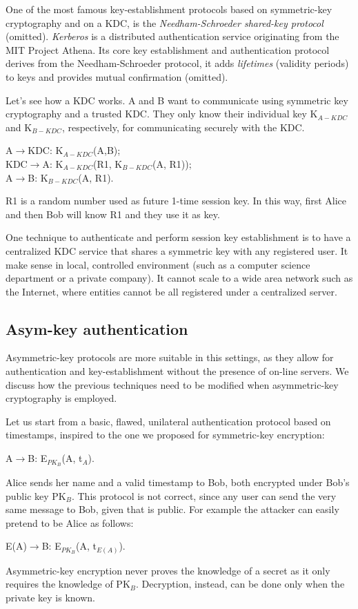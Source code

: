 \documentclass[a4paper, 12pt]{report}
\begin{document}
One of the most famous key-establishment protocols based on symmetric-key cryptography and on a KDC, is the \textit{Needham-Schroeder shared-key protocol} (omitted). \textit{Kerberos} is a distributed authentication service originating from the MIT Project Athena. Its core key establishment and authentication protocol derives from the Needham-Schroeder protocol, it adds \textit{lifetimes} (validity periods) to keys and provides mutual confirmation (omitted).

Let's see how a KDC works. A and B want to communicate using symmetric key cryptography and a trusted KDC. They only know their individual key K$_{A-KDC}$ and K$_{B-KDC}$, respectively, for communicating securely with the KDC.
\begin{center}
	A$\rightarrow$KDC: K$_{A-KDC}$(A,B);\\
	KDC$\rightarrow$A: K$_{A-KDC}$(R1, K$_{B-KDC}$(A, R1));\\
	A$\rightarrow$B: K$_{B-KDC}$(A, R1).
\end{center}

R1 is a random number used as future 1-time session key. In this way, first Alice and then Bob will know R1 and they use it as key.

One technique to authenticate and perform session key establishment is to have a centralized KDC service that shares a symmetric key with any registered user. It make sense in local, controlled environment (such as a computer science department or a private company). It cannot scale to a wide area network such as the Internet, where entities cannot be all registered under a centralized server.

\subsection*{Asym-key authentication}
Asymmetric-key protocols are more suitable in this settings, as they allow for authentication and key-establishment without the presence of on-line servers. We discuss how the previous techniques need to be modified when asymmetric-key cryptography is employed.

Let us start from a basic, flawed, unilateral authentication protocol based on timestamps, inspired to the one we proposed for symmetric-key encryption:
\begin{center}
	A$\rightarrow$B: E$_{PK_B}$(A, t$_A$).
\end{center}

Alice sends her name and a valid timestamp to Bob, both encrypted under Bob's public key PK$_B$. This protocol is not correct, since any user can send the very same message to Bob, given that is public. For example the attacker can easily pretend to be Alice as follows:
\begin{center}
	E(A)$\rightarrow$B: E$_{PK_B}$(A, t$_{E(A)}$).
\end{center}
Asymmetric-key encryption never proves the knowledge of a secret as it only requires the knowledge of PK$_B$. Decryption, instead, can be done only when the private key is known.
\end{document}
